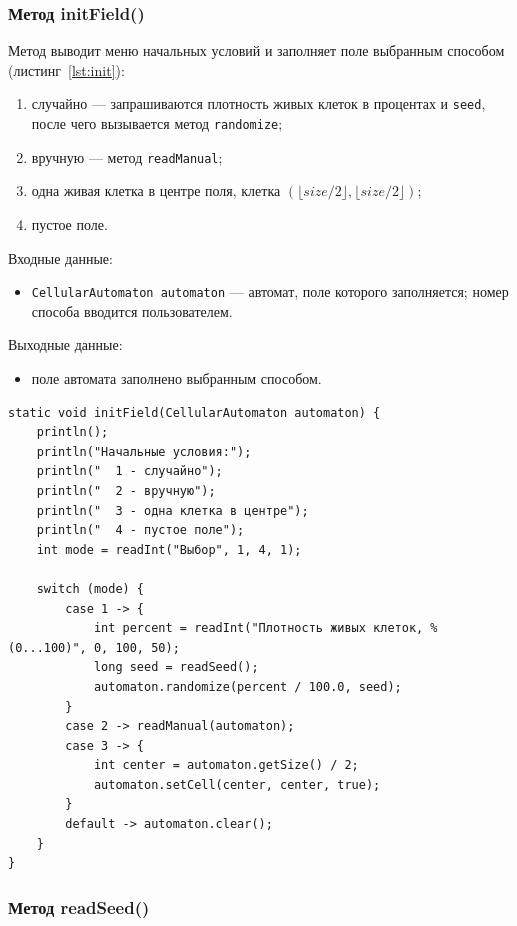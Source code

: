 \subsubsection*{Метод initField()}

Метод выводит меню начальных условий и заполняет поле выбранным способом (листинг~\ref{lst:init}):
\begin{enumerate}
	\item случайно --- запрашиваются плотность живых клеток в процентах и \texttt{seed}, после чего вызывается метод \texttt{randomize};
	\item вручную --- метод \texttt{readManual};
	\item одна живая клетка в центре поля, клетка $(\lfloor size/2 \rfloor, \lfloor size/2 \rfloor)$;
	\item пустое поле.
\end{enumerate}

Входные данные:
\begin{itemize}
	\item \texttt{CellularAutomaton automaton} --- автомат, поле которого заполняется; номер способа вводится пользователем.
\end{itemize}

Выходные данные:
\begin{itemize}
	\item поле автомата заполнено выбранным способом.
\end{itemize}

\begin{lstlisting}[caption={Метод initField()}, label={lst:init}]
static void initField(CellularAutomaton automaton) {
	println();
	println("Начальные условия:");
	println("  1 - случайно");
	println("  2 - вручную");
	println("  3 - одна клетка в центре");
	println("  4 - пустое поле");
	int mode = readInt("Выбор", 1, 4, 1);

	switch (mode) {
		case 1 -> {
			int percent = readInt("Плотность живых клеток, % (0...100)", 0, 100, 50);
			long seed = readSeed();
			automaton.randomize(percent / 100.0, seed);
		}
		case 2 -> readManual(automaton);
		case 3 -> {
			int center = automaton.getSize() / 2;
			automaton.setCell(center, center, true);
		}
		default -> automaton.clear();
	}
}
\end{lstlisting}

\subsubsection*{Метод readSeed()}

